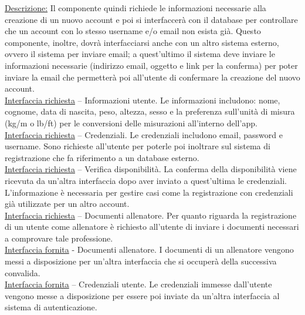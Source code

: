 \documentclass{article}
\begin{document}
      \underline{Descrizione:} Il componente quindi richiede le informazioni necessarie alla creazione di un nuovo account e poi si interfaccerà con il database per controllare che un
      account con lo stesso username e/o email non esista già. Questo componente, inoltre, dovrà interfacciarsi anche con un altro sistema esterno, ovvero il sistema per inviare email;
      a quest’ultimo il sistema deve inviare le informazioni necessarie (indirizzo email, oggetto e link per la conferma) per poter inviare la email che permetterà poi all’utente di
      confermare la creazione del nuovo account.\\

      \underline{Interfaccia richiesta} – Informazioni utente. Le informazioni includono: nome, cognome, data di nascita, peso, altezza, sesso e la preferenza sull'unità di misura
      (kg/m o lb/ft) per le conversioni delle misurazioni all'interno dell'app.\\

      \underline{Interfaccia richiesta} – Credenziali. Le credenziali includono email, password e username. Sono richieste all’utente per poterle poi inoltrare sul sistema di
      registrazione che fa riferimento a un database esterno.\\

      \underline{Interfaccia richiesta} – Verifica disponibilità. La conferma della disponibilità viene ricevuta da un’altra interfaccia dopo aver inviato a quest’ultima le
      credenziali. L’informazione è necessaria per gestire casi come la registrazione con credenziali già utilizzate per un altro account.\\

      \underline{Interfaccia richiesta} – Documenti allenatore. Per quanto riguarda la registrazione di un utente come allenatore è richiesto all'utente di inviare i documenti
      necessari a comprovare tale professione.\\

      \underline{Interfaccia fornita} - Documenti allenatore. I documenti di un allenatore vengono messi a disposizione per un'altra interfaccia che si occuperà della successiva
      convalida.\\

      \underline{Interfaccia fornita} – Credenziali utente. Le credenziali immesse dall’utente vengono messe a disposizione per essere poi inviate da un’altra interfaccia al sistema di 
      autenticazione.\\
\end{document}
